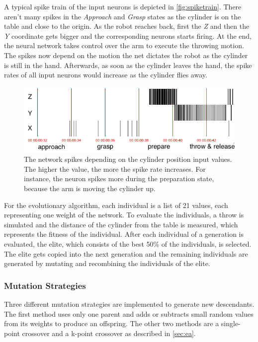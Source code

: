 A typical spike train of the input neurons is depicted in \autoref{fig:spiketrain}.
There aren't many spikes in the \textit{Approach} and \textit{Grasp} states as the cylinder is on the table and close to the origin.
As the robot reaches back, first the \textit{Z} and then the \textit{Y} coordinate gets bigger and the corresponding neurons starts firing.
At the end, the neural network takes control over the arm to execute the throwing motion.
The spikes now depend on the motion the net dictates the robot as the cylinder is still in the hand.
Afterwards, as soon as the cylinder leaves the hand, the spike rates of all input neurons would increase as the cylinder flies away.

\begin{figure}[h]
\centering
\includegraphics[width=.95\columnwidth]{figures/spike_train.png}
\caption{The network spikes depending on the cylinder position input values. The higher the value, the more the spike rate increases. For instance, the neuron spikes more during the preparation state, because the arm is moving the cylinder up.}
\label{fig:spiketrain}
\end{figure}

For the evolutionary algorithm, each individual is a list of 21 values, each representing one weight of the network.
To evaluate the individuals, a throw is simulated and the distance of the cylinder from the table is measured, which represents the fitness of the individual.
After each individual of a generation is evaluated, the elite, which consists of the best 50\% of the individuals, is selected.
The elite gets copied into the next generation and the remaining individuals are generated by mutating and recombining the individuals of the elite.

\subsubsection{Mutation Strategies}
Three different mutation strategies are implemented to generate new descendants.
The first method uses only one parent and adds or subtracts small random values from its weights to produce an offspring.
The other two methods are a single-point crossover and a k-point crossover as described in \autoref{sec:ea}.


